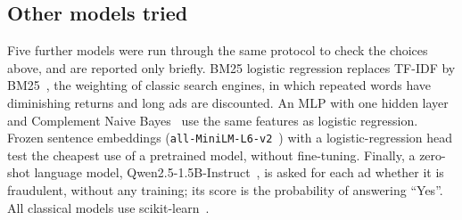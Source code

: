 \subsection{Other models tried}

Five further models were run through the same protocol to check the choices above, and are
reported only briefly. BM25 logistic regression replaces TF-IDF by BM25~\cite{robertson2009}, the
weighting of classic search engines, in which repeated words have diminishing returns and long ads
are discounted. An MLP with one hidden layer and Complement Naive Bayes~\cite{rennie2003} use the
same features as logistic regression. Frozen sentence embeddings
(\texttt{all-MiniLM-L6-v2}~\cite{reimers2019,wang2020minilm}) with a logistic-regression head test the
cheapest use of a pretrained model, without fine-tuning. Finally, a zero-shot language model,
Qwen2.5-1.5B-Instruct~\cite{qwen2024}, is asked for each ad whether it is fraudulent, without any
training; its score is the probability of answering ``Yes''. All classical models use
scikit-learn~\cite{pedregosa2011}.
